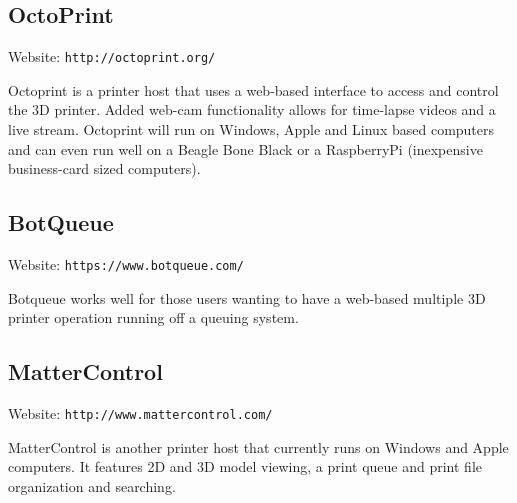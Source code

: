 \subsection{OctoPrint}
Website: \texttt{http://octoprint.org/}

Octoprint is a printer host that uses a web-based interface to access and control the 3D printer. Added web-cam functionality allows for time-lapse videos and a live stream. Octoprint will run on Windows, Apple and Linux based computers and can even run well on a Beagle Bone Black or a RaspberryPi (inexpensive business-card sized computers). 

\subsection{BotQueue}
Website: \texttt{https://www.botqueue.com/}

Botqueue works well for those users wanting to have a web-based multiple 3D printer operation running off a queuing system.


\subsection{MatterControl}
Website: \texttt{http://www.mattercontrol.com/}

MatterControl is another printer host that currently runs on Windows and Apple computers. It features 2D and 3D model viewing, a print queue and print file organization and searching.

